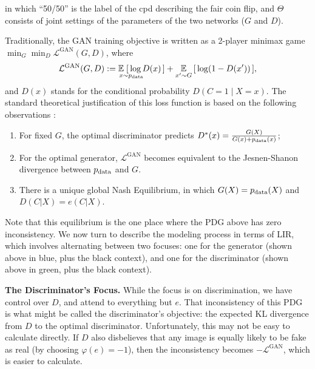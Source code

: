 in which ``50/50'' is the label of the cpd describing the fair coin flip, and $\Theta$ consists of joint settings of the parameters of the two networks ($G$ and $D$). 

Traditionally, the GAN training objective is written as a 2-player minimax game
$
    \min_{G} \min_{D}  \mathcal L^{\text{GAN}}(G,D)
$, where
\[
\mathcal L^{\text{GAN}}(G,D) := \Ex_{\vphantom{|}x \mathrlap{\sim \pdata}}
    \;[\, \log D(x) \, ] + \Ex_{\vphantom{|} x' \sim G} \, [\,\log (1- D(x')) \,],
\]
and $D(x)$ stands for the conditional probability $D(C{=}1 \mid X={x})$. 
The standard theoretical justification of this loss function 
is based on the following observations \citep{goodfellow2020generative}:
\begin{enumerate}[nosep]
    \item For fixed $G$, the optimal discriminator predicts $D^*(x) = \frac{G(X)}{G(x) + p_{\mathrm{data}}(x)}$;
    \item For the optimal generator, $\mathcal L^{\text{GAN}}$ becomes equivalent to the Jesnen-Shanon divergence \citep{MENENDEZ1997307} between $p_{\mathrm{data}}$ and $G$.
    \item There is a unique global Nash Equilibrium, in which $G(X) = p_{\mathrm{data}}(X)$ and $D(C | X) = e(C|X)$. 
\end{enumerate}
Note that this equilibrium is the one place where the PDG above has zero inconsistency. 
We now turn to describe the modeling process in terms of LIR, which involves alternating between two focuses: one for the generator (shown above in blue, plus the black context), and one for the discriminator (shown above in green, plus the black context). 


\textbf{The Discriminator's Focus.}
While the focus is on discrimination, 
    we have control over $D$, and attend to
    everything but $e$.
That inconsistency of this PDG is what might be called
    the discriminator's objective:
    the expected KL divergence from $D$ to the optimal discriminator.
Unfortunately, this may not be easy to calculate directly. 
If $D$ also disbelieves that any image is equally likely to be fake as real
    (by choosing $\varphi(e) = -1$),
then the inconsistency becomes $-\mathcal L^{\text{GAN}}$, which is easier to calculate.

